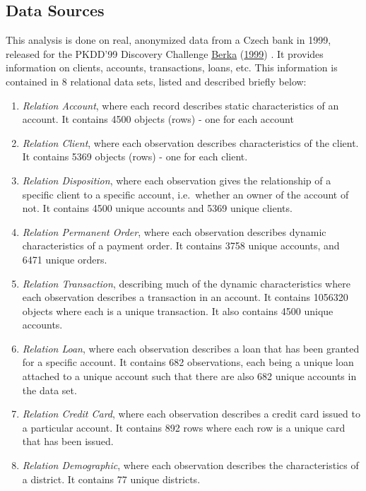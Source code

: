 \documentclass[11pt,preprint, authoryear]{elsarticle}
\numberwithin{equation}{section}
\numberwithin{figure}{section}
\numberwithin{table}{section}
\def\tightlist{} %
\begin{document}
\hypertarget{data-sources}{%
\subsection{Data Sources}\label{data-sources}}

This analysis is done on real, anonymized data from a Czech bank in
1999, released for the PKDD'99 Discovery Challenge
\protect\hyperlink{ref-Data}{Berka} (\protect\hyperlink{ref-Data}{1999})
. It provides information on clients, accounts, transactions, loans,
etc. This information is contained in 8 relational data sets, listed and
described briefly below:

\begin{enumerate}
\def\labelenumi{\arabic{enumi}.}
\tightlist
\item
  \emph{Relation Account}, where each record describes static
  characteristics of an account. It contains 4500 objects (rows) - one
  for each account
\item
  \emph{Relation Client}, where each observation describes
  characteristics of the client. It contains 5369 objects (rows) - one
  for each client.
\item
  \emph{Relation Disposition}, where each observation gives the
  relationship of a specific client to a specific account, i.e.~whether
  an owner of the account of not. It contains 4500 unique accounts and
  5369 unique clients.
\item
  \emph{Relation Permanent Order}, where each observation describes
  dynamic characteristics of a payment order. It contains 3758 unique
  accounts, and 6471 unique orders.
\item
  \emph{Relation Transaction}, describing much of the dynamic
  characteristics where each observation describes a transaction in an
  account. It contains 1056320 objects where each is a unique
  transaction. It also contains 4500 unique accounts.
\item
  \emph{Relation Loan}, where each observation describes a loan that has
  been granted for a specific account. It contains 682 observations,
  each being a unique loan attached to a unique account such that there
  are also 682 unique accounts in the data set.
\item
  \emph{Relation Credit Card}, where each observation describes a credit
  card issued to a particular account. It contains 892 rows where each
  row is a unique card that has been issued.
\item
  \emph{Relation Demographic}, where each observation describes the
  characteristics of a district. It contains 77 unique districts.
\end{enumerate}
\end{document}
